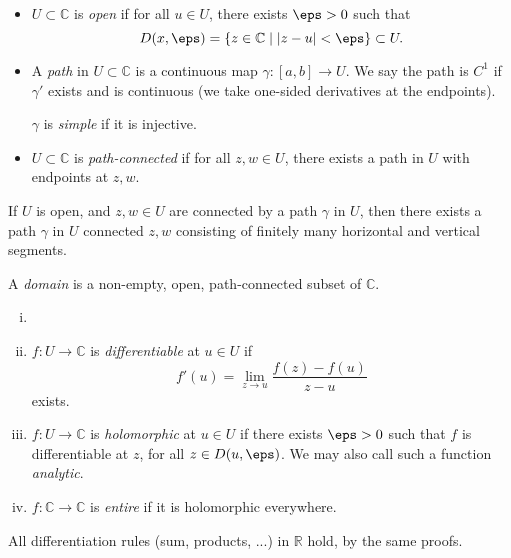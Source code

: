 \documentclass[12pt]{article}
\begin{document}
\begin{itemize}
	\item $U \subset \mathbb{C}$ is \emph{open} if for all $u \in U$, there exists $\eps > 0$ such that
		\[
			D(x, \eps) = \{z \in \mathbb{C} \mid |z - u| < \eps\} \subset U
		.\]
	\item A \emph{path} in $U \subset \mathbb{C}$ is a continuous map $\gamma : [a, b] \to U$. We say the path is $C^{1}$ if $\gamma'$ exists and is continuous (we take one-sided derivatives at the endpoints).

		$\gamma$ is \emph{simple} if it is injective.
	\item $U \subset \mathbb{C}$ is \emph{path-connected} if for all $z, w \in U$, there exists a path in $U$ with endpoints at $z, w$.
\end{itemize}
\begin{remark}
	If $U$ is open, and $z, w \in U$ are connected by a path $\gamma$ in $U$, then there exists a path $\gamma$ in $U$ connected $z, w$ consisting of finitely many horizontal and vertical segments.
\end{remark}

\begin{definition}
	A \emph{domain} is a non-empty, open, path-connected subset of $\mathbb{C}$.
\end{definition}

\begin{definition}
	\begin{enumerate}[(i)]
		\item[]
		\item $f : U \to \mathbb{C}$ is \emph{differentiable} at $u \in U$ if
			\[
			f'(u) = \lim_{z \to u} \frac{f(z) - f(u)}{z - u}
			\]
			exists.
		\item $f : U \to \mathbb{C}$ is \emph{holomorphic} at $u \in U$ if there exists $\eps > 0$ such that $f$ is differentiable at $z$, for all $z \in D(u, \eps)$. We may also call such a function \emph{analytic}.
		\item $f : \mathbb{C} \to \mathbb{C}$ is \emph{entire} if it is holomorphic everywhere.
	\end{enumerate}
\end{definition}

\begin{remark}
	All differentiation rules (sum, products, ...) in $\mathbb{R}$ hold, by the same proofs.
\end{remark}
\end{document}
